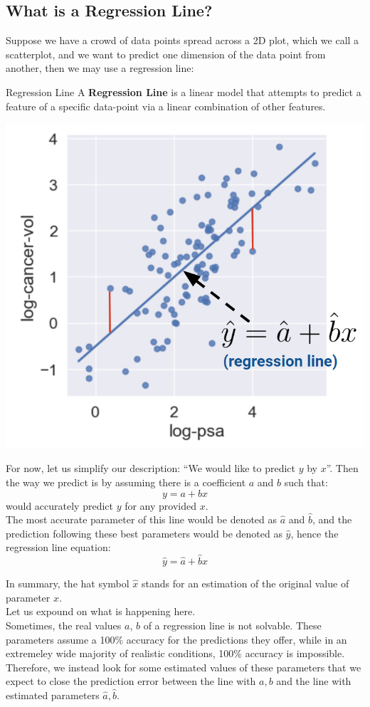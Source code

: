 \subsection{What is a Regression Line?}
Suppose we have a crowd of data points spread across a 2D plot, which we call a scatterplot, and we want to predict one dimension of the data point from another, then we may use a regression line:
\begin{ln-define}{Regression Line}{}
    A \textbf{Regression Line} is a linear model that attempts to predict a feature of a specific data-point via a linear combination of other features.
    \tcblower
    \begin{center}
        \includegraphics[scale=0.4]{figs/ln01/regression-line.png}
    \end{center}
\end{ln-define}
For now, let us simplify our description: ``We would like to predict $y$ by $x$''. Then the way we predict is by assuming there is a coefficient $a$ and $b$ such that:
\[y = a + bx\]
would accurately predict $y$ for any provided $x$. \\
The most accurate parameter of this line would be denoted as $\hat{a}$ and $\hat{b}$, and the prediction following these best parameters would be denoted as $\hat{y}$, hence the regression line equation:
\[\hat{y} = \hat{a} + \hat{b}x\]

In summary, the hat symbol $\hat{x}$ stands for an estimation of the original value of parameter $x$. \\
Let us expound on what is happening here. \\
Sometimes, the real values $a$, $b$ of a regression line is not solvable. These parameters assume a 100\% accuracy for the predictions they offer, while in an extremeley wide majority of realistic conditions, 100\% accuracy is impossible.
Therefore, we instead look for some estimated values of these parameters that we expect to close the prediction error between the line with $a, b$ and the line with estimated parameters $\hat{a}, \hat{b}$.

